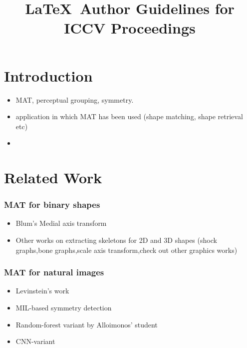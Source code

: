 \documentclass[10pt,twocolumn,letterpaper]{article}
\begin{document}
\title{\LaTeX\ Author Guidelines for ICCV Proceedings}
\maketitle


\begin{abstract}
\end{abstract}

\section{Introduction}\label{sec:introduction}
\begin{itemize}
\item MAT, perceptual grouping, symmetry.
\item application in which MAT has been used (shape matching, shape retrieval etc)
\item
\end{itemize}


\section{Related Work}\label{sec:related}
\subsubsection*{MAT for binary shapes}
\begin{itemize}
\item Blum's Medial axis transform
\item Other works on extracting skeletons for 2D and 3D shapes (shock graphs,bone graphs,scale axis transform,check out other graphics works)
\end{itemize}
\subsubsection*{MAT for natural images}
\begin{itemize}
\item Levinstein's work
\item MIL-based symmetry detection
\item Random-forest variant by Alloimonos' student
\item CNN-variant 
\end{itemize}
\end{document}
